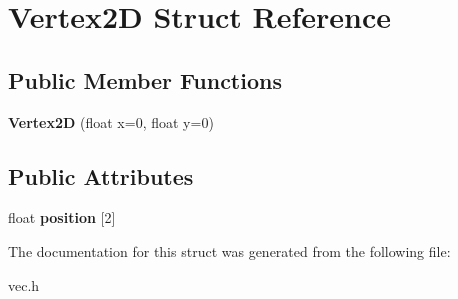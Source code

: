 \hypertarget{structVertex2D}{\section{Vertex2\-D Struct Reference}
\label{structVertex2D}
}
\subsection*{Public Member Functions}
\begin{DoxyCompactItemize}
\item 
\hypertarget{structVertex2D_a2c1b4db8727345bf194c2174f3f26e8f}{{\bfseries Vertex2\-D} (float x=0, float y=0)}\label{structVertex2D_a2c1b4db8727345bf194c2174f3f26e8f}

\end{DoxyCompactItemize}
\subsection*{Public Attributes}
\begin{DoxyCompactItemize}
\item 
\hypertarget{structVertex2D_a9fef6541ceac3665388a4f8cc0afc17f}{float {\bfseries position} \mbox{[}2\mbox{]}}\label{structVertex2D_a9fef6541ceac3665388a4f8cc0afc17f}

\end{DoxyCompactItemize}


The documentation for this struct was generated from the following file\-:\begin{DoxyCompactItemize}
\item 
vec.\-h\end{DoxyCompactItemize}
